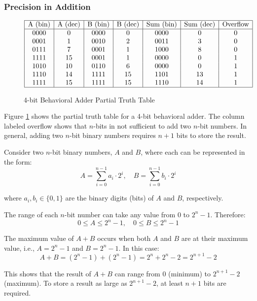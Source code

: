 {\subsubsection{Precision in Addition}
\begin{figure}[H]
    \centering
\[
\begin{array}{|c|c|c|c|c|c|c|}
\hline
\text{A (bin)} & \text{A (dec)} & \text{B (bin)} & \text{B (dec)} & \text{Sum (bin)} & \text{Sum (dec)} & \text{Overflow} \\
\hline
0000 & 0 & 0000 & 0 & 0000 & 0 & 0 \\
0001 & 1 & 0010 & 2 & 0011 & 3 & 0 \\
0111 & 7 & 0001 & 1 & 1000 & 8 & 0 \\
1111 & 15 & 0001 & 1 & 0000 & 0 & 1 \\
1010 & 10 & 0110 & 6 & 0000 & 0 & 1 \\
1110 & 14 & 1111 & 15 & 1101 & 13 & 1 \\
1111 & 15 & 1111 & 15 & 1110 & 14 & 1 \\
\hline
\end{array}
\]
    \caption{4-bit Behavioral Adder Partial Truth Table}
    \label{fig:4bit_adder_tt} 
\end{figure}

Figure \ref{fig:4bit_adder_tt} shows the partial truth table for a 4-bit behavioral adder. The column labeled overflow shows that $n$-bits in not sufficient to add two $n$-bit numbers. In general, adding two $n$-bit binary numbers requires $n+1$ bits to store the result.

Consider two $n$-bit binary numbers, $A$ and $B$, where each can be represented in the form:
\[
A = \sum_{i=0}^{n-1} a_i \cdot 2^i, \quad B = \sum_{i=0}^{n-1} b_i \cdot 2^i
\]

where $a_i, b_i \in \{0, 1\}$ are the binary digits (bits) of $A$ and $B$, respectively.

The range of each $n$-bit number can take any value from $0$ to $2^n - 1$. Therefore:
\[
0 \leq A \leq 2^n - 1, \quad 0 \leq B \leq 2^n - 1
\]

The maximum value of $A + B$ occurs when both $A$ and $B$ are at their maximum value, i.e., $A = 2^n - 1$ and $B = 2^n - 1$. In this case:
\[
A + B = (2^n - 1) + (2^n - 1) = 2^n + 2^n - 2 = 2^{n+1} - 2
\]

This shows that the result of $A + B$ can range from $0$ (minimum) to $2^{n+1} - 2$ (maximum). To store a result as large as $2^{n+1} - 2$, at least $n+1$ bits are required.

}

